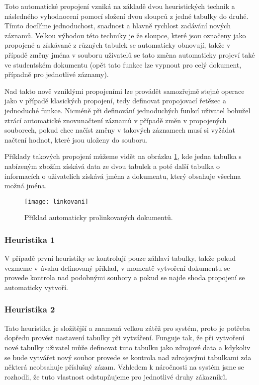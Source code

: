 \par Toto automatické propojení vzniká na základě dvou heuristických technik a následného vyhodnocení pomocí složení dvou sloupců z jedné tabulky do druhé. Tímto docílíme jednoduchost, snadnost a hlavně rychlost zadávání nových záznamů. Velkou výhodou této techniky je že sloupce, které jsou označeny jako propojené a získávané z různých tabulek se automaticky obnovují, takže v případě změny jména v souboru uživatelů se tato změna automaticky projeví také ve studentském dokumentu (opět tato funkce lze vypnout pro celý dokument, případně pro jednotlivé záznamy).

\par Nad takto nově vzniklými propojeními lze provádět samozřejmě stejné operace jako v případě klasických propojení, tedy definovat propojovací řetězec a jednoduché funkce. Nicméně při definování jednoduchých funkcí uživatel bohužel ztrácí automatické znovunačtení záznamů v případě změn v propojených souborech, pokud chce načíst změny v takových záznamech musí si vyžádat načtení hodnot, které jsou uloženy do souboru.

\par Příklady takových propojení můžeme vidět na obrázku \ref{linkovani}, kde jedna tabulka s nabízeným zbožím získává data ze dvou tabulek a poté další tabulka o informacích o uživatelích získává jména z dokumentu, který obsahuje všechna možná jména.

\begin{figure}[htp]
  \centering
  \texttt{[image: linkovani]}
  \caption{Příklad automaticky prolinkovaných dokumentů.}
  \label{linkovani}
\end{figure}

\subsubsection{Heuristika 1}
\par V případě první heuristiky se kontrolují pouze záhlaví tabulky, takže pokud vezmeme v úvahu definovaný příklad, v momentě vytvoření dokumentu se provede kontrola nad podobnými soubory a pokud se najde shoda propojení se automaticky vytvoří.
\subsubsection{Heuristika 2}
\par Tato heuristika je složitější a znamená velkou zátěž pro systém, proto je potřeba dopředu provést nastavení tabulky při vytváření. Funguje tak, že při vytvoření nové tabulky uživatel může definovat tuto tabulku jako zdrojové data a kdykoliv se bude vytvářet nový soubor provede se kontrola nad zdrojovými tabulkami zda některá neobsahuje příslušný zázam. Vzhledem k náročnosti na systém jsme se rozhodli, že tuto vlastnost odstupňujeme pro jednotlivé druhy zákazníků.

